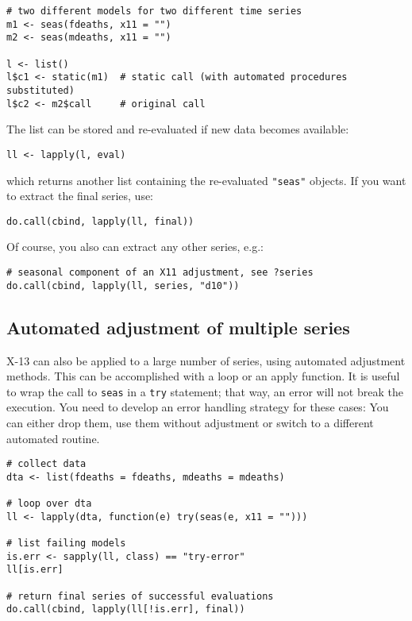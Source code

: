 \begin{verbatim}
# two different models for two different time series
m1 <- seas(fdeaths, x11 = "")
m2 <- seas(mdeaths, x11 = "")

l <- list()
l$c1 <- static(m1)  # static call (with automated procedures substituted)
l$c2 <- m2$call     # original call
\end{verbatim}

The list can be stored and re-evaluated if new data becomes available:

\begin{verbatim}
ll <- lapply(l, eval)
\end{verbatim}

which returns another list containing the re-evaluated \texttt{"seas"}
objects. If you want to extract the final series, use:

\begin{verbatim}
do.call(cbind, lapply(ll, final))
\end{verbatim}

Of course, you also can extract any other series, e.g.:

\begin{verbatim}
# seasonal component of an X11 adjustment, see ?series
do.call(cbind, lapply(ll, series, "d10"))
\end{verbatim}

\subsection{Automated adjustment of multiple
series}\label{automated-adjustment-of-multiple-series}

X-13 can also be applied to a large number of series, using automated
adjustment methods. This can be accomplished with a loop or an apply
function. It is useful to wrap the call to \texttt{seas} in a
\texttt{try} statement; that way, an error will not break the execution.
You need to develop an error handling strategy for these cases: You can
either drop them, use them without adjustment or switch to a different
automated routine.

\begin{verbatim}
# collect data 
dta <- list(fdeaths = fdeaths, mdeaths = mdeaths)

# loop over dta
ll <- lapply(dta, function(e) try(seas(e, x11 = "")))

# list failing models
is.err <- sapply(ll, class) == "try-error"
ll[is.err]

# return final series of successful evaluations
do.call(cbind, lapply(ll[!is.err], final))
\end{verbatim}

